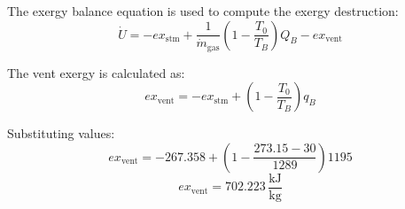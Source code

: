 The exergy balance equation is used to compute the exergy destruction:  
\[
\dot{U} = - ex_{\text{stm}} + \frac{1}{\dot{m}_{\text{gas}}} \left( 1 - \frac{T_0}{T_B} \right) Q_B - ex_{\text{vent}}
\]  

The vent exergy is calculated as:  
\[
ex_{\text{vent}} = - ex_{\text{stm}} + \left( 1 - \frac{T_0}{T_B} \right) q_B
\]  

Substituting values:  
\[
ex_{\text{vent}} = -267.358 + \left( 1 - \frac{273.15 - 30}{1289} \right) 1195
\]  
\[
ex_{\text{vent}} = 702.223 \, \frac{\text{kJ}}{\text{kg}}
\]